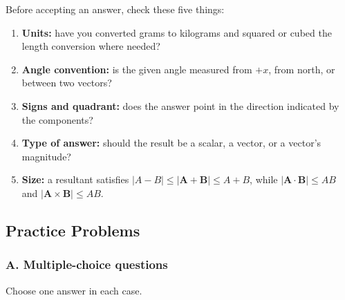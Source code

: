 \documentclass[11pt,letterpaper]{article}
\newcommand{\vect}[1]{\boldsymbol{#1}}
\begin{document}
\begin{watchbox}
Before accepting an answer, check these five things:
\begin{enumerate}
\item \textbf{Units:} have you converted grams to kilograms and squared or cubed the length conversion where needed?
\item \textbf{Angle convention:} is the given angle measured from $+x$, from north, or between two vectors?
\item \textbf{Signs and quadrant:} does the answer point in the direction indicated by the components?
\item \textbf{Type of answer:} should the result be a scalar, a vector, or a vector's magnitude?
\item \textbf{Size:} a resultant satisfies $|A-B|\leq|\vect A+\vect B|\leq A+B$, while $|\vect A\cdot\vect B|\leq AB$ and $|\vect A\times\vect B|\leq AB$.
\end{enumerate}
\end{watchbox}

\newpage
\subsection*{Practice Problems}

\subsubsection*{A. Multiple-choice questions}
Choose one answer in each case.
\end{document}
